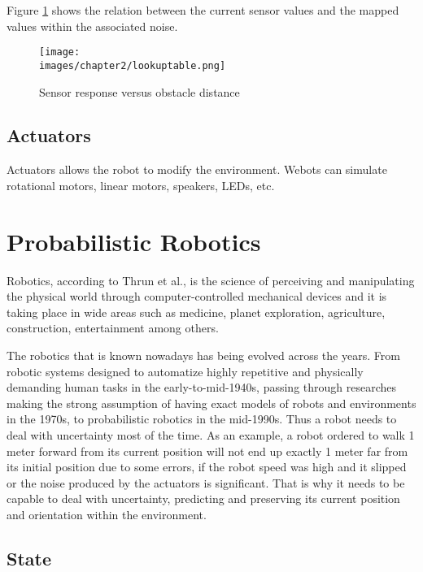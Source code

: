 Figure \ref{fig:ch-2:lookup} shows the relation between the current sensor values and the mapped values within the associated noise.

\begin{figure}[h!]
  \centering
  \texttt{[image: \\images/chapter2/lookuptable.png]}
  \caption{Sensor response versus obstacle distance}
  \label{fig:ch-2:lookup}
\end{figure}

\subsection{Actuators}

Actuators allows the robot to modify the environment. Webots can simulate rotational motors, linear motors, speakers, LEDs, etc. 

\section{Probabilistic Robotics}

Robotics, according to Thrun et al.\cite{Thrun:2005:PR:1121596}, is the science of perceiving and manipulating the physical world through computer-controlled mechanical devices and it is taking place in wide areas such as medicine\cite{Azad:STAR}, planet exploration\cite{Geoffrey:venus}, agriculture\cite{Shamshiri:research-agricultural}, construction\cite{Pileun:construction}, entertainment\cite{Morris:entertainment} among others. 

The robotics that is known nowadays has being evolved across the years. From robotic systems designed to automatize highly repetitive and physically demanding human tasks in the early-to-mid-1940s\cite{Ferreira:prob}, passing through researches making the strong assumption of having exact models of robots and environments in the 1970s, to probabilistic robotics in the mid-1990s\cite{Thrun:robotic-statistics}. Thus a robot needs to deal with uncertainty most of the time. As an example, a robot ordered to walk 1 meter forward from its current position will not end up exactly 1 meter far from its initial position due to some errors, if the robot speed was high and it slipped or the noise produced by the actuators is significant. That is why it needs to be capable to deal with uncertainty, predicting and preserving its current position and orientation within the environment\cite{Nikos:auxiliary-pf}.

\subsection{State}

